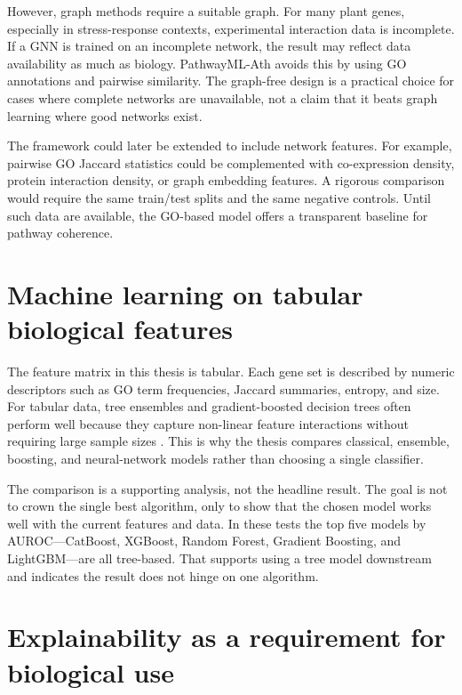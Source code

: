 \documentclass[12pt,letterpaper,oneside,openany]{book}
\begin{document}
However, graph methods require a suitable graph. For many plant genes, especially in stress-response contexts, experimental interaction data is incomplete. If a GNN is trained on an incomplete network, the result may reflect data availability as much as biology. PathwayML-Ath avoids this by using GO annotations and pairwise similarity. The graph-free design is a practical choice for cases where complete networks are unavailable, not a claim that it beats graph learning where good networks exist.

The framework could later be extended to include network features. For example, pairwise GO Jaccard statistics could be complemented with co-expression density, protein interaction density, or graph embedding features. A rigorous comparison would require the same train/test splits and the same negative controls. Until such data are available, the GO-based model offers a transparent baseline for pathway coherence.

\section{Machine learning on tabular biological features}
\label{sec:lit_tabular_extended}

The feature matrix in this thesis is tabular. Each gene set is described by numeric descriptors such as GO term frequencies, Jaccard summaries, entropy, and size. For tabular data, tree ensembles and gradient-boosted decision trees often perform well because they capture non-linear feature interactions without requiring large sample sizes \citep{breiman2001random,friedman2001greedy,chen2016xgboost,ke2017lightgbm,prokhorenkova2018catboost,grinsztajn2022why}. This is why the thesis compares classical, ensemble, boosting, and neural-network models rather than choosing a single classifier.

The comparison is a supporting analysis, not the headline result. The goal is not to crown the single best algorithm, only to show that the chosen model works well with the current features and data. In these tests the top five models by AUROC---CatBoost, XGBoost, Random Forest, Gradient Boosting, and LightGBM---are all tree-based. That supports using a tree model downstream and indicates the result does not hinge on one algorithm.

\section{Explainability as a requirement for biological use}
\label{sec:lit_xai_extended}
\end{document}
